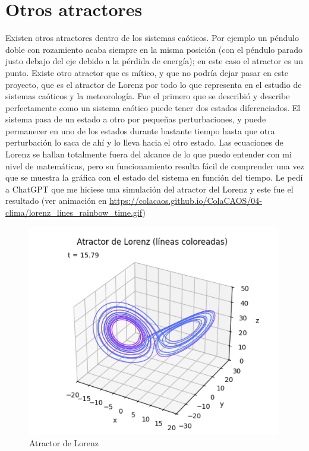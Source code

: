 \documentclass[
  10pt,
  a4paper,
  DIV=11,
  numbers=noendperiod,
  open=any]{scrreprt}
\numberwithin{equation}{chapter}
\numberwithin{equation}{section}
\renewcommand{\[}{\begin{equation}}
\renewcommand{\]}{\end{equation}}
\begin{document}
\section{Otros atractores}\label{otros-atractores}

Existen otros atractores dentro de los sistemas caóticos. Por ejemplo un
péndulo doble con rozamiento acaba siempre en la misma posición (con el
péndulo parado justo debajo del eje debido a la pérdida de energía); en
este caso el atractor es un punto. Existe otro atractor que es mítico, y
que no podría dejar pasar en este proyecto, que es el atractor de Lorenz
por todo lo que representa en el estudio de sistemas caóticos y la meteorología. Fue el primero que se describió y describe perfectamente como un
sistema caótico puede tener dos estados diferenciados. El sistema pasa
de un estado a otro por pequeñas perturbaciones, y puede permanecer en
uno de los estados durante bastante tiempo hasta que otra perturbación
lo saca de ahí y lo lleva hacia el otro estado. Las ecuaciones de Lorenz
se hallan totalmente fuera del alcance de lo que puedo entender con mi
nivel de matemáticas, pero su funcionamiento resulta fácil de comprender
una vez que se muestra la gráfica con el estado del sistema en función
del tiempo. Le pedí a ChatGPT que me hiciese una simulación del atractor
del Lorenz y este fue el resultado (ver animación en \url{https://colacaos.github.io/ColaCAOS/04-clima/lorenz_lines_rainbow_time.gif})

\begin{figure}[h]
  \centering
  \includegraphics[width=0.99\textwidth]{04-clima/lorenz_lines_rainbow_time.png}
  \caption{Atractor de Lorenz}
  \label{fig:lorenz}
\end{figure}
\end{document}
